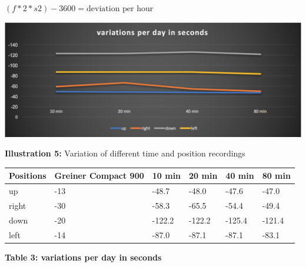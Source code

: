 \documentclass[12pt, a4paper]{report}
\begin{document}
\((f*2*s2)-3600=\text{deviation per hour}\)

\begin{center}
    \includegraphics[scale=0.3]{Images/variations_per_day.png}
    
    {\bf Illustration 5:} Variation of different time and position recordings
\end{center}
\begin{table}[H]
    \begin{tabular}{|l|l|l|l|l|l|}
    \hline
    Positions & Greiner Compact 900 & 10 min & 20 min & 40 min & 80 min \\ \hline
    up        & -13                 & -48.7     & -48.0     & -47.6      & -47.0      \\ \hline
    right     & -30                 & -58.3      & -65.5    & -54.4      & -49.4      \\ \hline
    down      & -20                 & -122.2    & -122.2     & -125.4    & -121.4      \\ \hline
    left      & -14                 & -87.0	   & -87.1	  & -87.1	  & -83.1      \\ \hline
\end{tabular}
\end{table}
\begin{center}    
{\bf Table 3: variations per day in seconds} 
\end{center}

\bigskip
\end{document}
